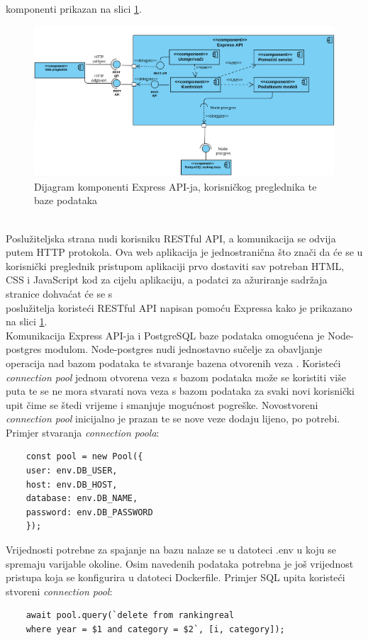 \documentclass[times, utf8, zavrsni]{fer}
\begin{document}
komponenti prikazan na slici \ref{fig:expressdijagramkomponenti}.
\begin{figure}[htb]
    \hspace*{-2cm} 
       \includegraphics[scale=0.25]{expressdijagramkomponenti.png} 
       \caption{Dijagram komponenti Express API-ja, korisničkog preglednika te baze podataka}
       \label{fig:expressdijagramkomponenti}
       \end{figure} 
\\Poslužiteljska strana nudi korisniku RESTful API, a komunikacija se odvija putem HTTP protokola. Ova web aplikacija je jednostranična što znači da će se u korisnički preglednik
pristupom aplikaciji prvo dostaviti sav potreban HTML, CSS i JavaScript kod za cijelu aplikaciju, a podatci za ažuriranje sadržaja stranice 
dohvaćat će se s \\poslužitelja koristeći RESTful API napisan pomoću Expressa kako je prikazano na slici \ref{fig:expressdijagramkomponenti}. \\Komunikacija
Express API-ja i PostgreSQL baze podataka omogućena je Node-postgres modulom. Node-postgres nudi jednostavno sučelje za obavljanje operacija nad bazom podataka te stvaranje 
bazena otvorenih veza . Koristeći \\\emph{connection pool} jednom otvorena veza s bazom podataka može se koristiti više puta te se ne mora 
stvarati nova veza s bazom podataka za svaki novi korisnički upit čime se štedi vrijeme i smanjuje mogućnost pogreške. Novostvoreni \emph{connection pool} inicijalno 
je prazan te se nove veze dodaju lijeno, po potrebi.
\newpage Primjer stvaranja \emph{connection poola}:
\lstset{language=Java, tabsize=2}
\begin{verbatim}
    const pool = new Pool({
    user: env.DB_USER,
    host: env.DB_HOST,
    database: env.DB_NAME,
    password: env.DB_PASSWORD
    });
\end{verbatim}
Vrijednosti potrebne za spajanje na bazu nalaze se u datoteci .env u koju se spremaju varijable okoline. Osim navedenih podataka potrebna je još 
vrijednost pristupa  koja se konfigurira u datoteci Dockerfile.  
Primjer SQL upita koristeći stvoreni \emph{connection pool}:
\begin{verbatim}
    await pool.query(`delete from rankingreal 
    where year = $1 and category = $2`, [i, category]);
\end{verbatim}
\end{document}
